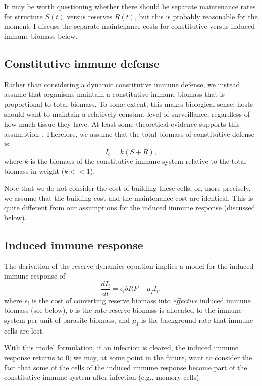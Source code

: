 \documentclass[12pt,reqno,final,pdftex]{amsart}\usepackage[]{graphicx}\usepackage[]{color}
\theoremstyle{plain}
\numberwithin{equation}{part}
\begin{document}
It may be worth questioning whether there should be separate maintenance rates for structure $S(t)$ versus reserves $R(t)$, but this is probably reasonable for the moment.
I discuss the separate maintenance costs for constitutive versus induced immune biomass below.

\subsection*{Constitutive immune defense}
Rather than considering a dynamic constitutive immune defense, we instead assume that organisms maintain a constitutive immune biomass that is proportional to total biomass.
To some extent, this makes biological sense: hosts should want to maintain a relatively constant level of surveillance, regardless of how much tissue they have.
At least some theoretical evidence supports this assumption \citep{Wiegel2004}.
Therefore, we assume that the total biomass of constitutive defense is:
\begin{equation}
I_c=k(S+R),
\end{equation}
where $k$ is the biomass of the constitutive immune system relative to the total biomass in weight ($k<<1$).

Note that we do not consider the cost of building these cells, or, more precisely, we assume that the building cost and the maintenance cost are identical.
This is quite different from our assumptions for the induced immune response (discussed below).

\subsection*{ Induced immune response}
The derivation of the reserve dynamics equation implies a model for the induced immune response of
\begin{equation}
\frac{dI_i}{dt}=\epsilon _ib R P-\mu _II_i,
\end{equation}
where $\epsilon _i$ is the cost of converting reserve biomass into \textit{effective} induced immune biomass (see below), $b$ is the rate reserve biomass is allocated to the immune system per unit of parasite biomass, and $\mu _I$ is the background rate that immune cells are lost.

With this model formulation, if an infection is cleared, the induced immune response returns to 0; we may, at some point in the future, want to consider the fact that some of the cells of the induced immune response become part of the constitutive immune system after infection (e.g., memory cells).
\end{document}
